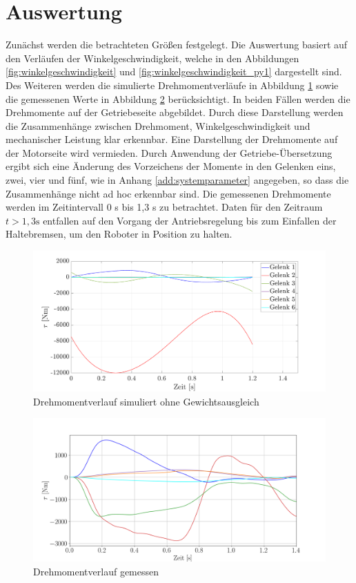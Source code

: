 \section{Auswertung}
Zunächst werden die betrachteten Größen festgelegt. Die Auswertung basiert auf den Verläufen der Winkelgeschwindigkeit, welche in den Abbildungen \ref{fig:winkelgeschwindigkeit} und \ref{fig:winkelgeschwindigkeit_py1} dargestellt sind. Des Weiteren werden die simulierte Drehmomentverläufe in Abbildung \ref{fig:taumat} sowie die gemessenen Werte in Abbildung \ref{fig:tau} berücksichtigt. In beiden Fällen werden die Drehmomente auf der Getriebeseite abgebildet. Durch diese Darstellung werden die Zusammenhänge zwischen Drehmoment, Winkelgeschwindigkeit und mechanischer Leistung klar erkennbar. Eine Darstellung der Drehmomente auf der Motorseite wird vermieden. Durch Anwendung der Getriebe-Übersetzung ergibt sich eine Änderung des Vorzeichens der Momente in den Gelenken eins, zwei, vier und fünf, wie in Anhang \ref{add:systemparameter} angegeben, so dass die Zusammenhänge nicht ad hoc erkennbar sind. Die gemessenen Drehmomente werden im Zeitintervall 0 s bis 1,3 s zu betrachtet. Daten für den Zeitraum $t>1,3\text{s}$ entfallen auf den Vorgang der Antriebsregelung bis zum Einfallen der Haltebremsen, um den Roboter in Position zu halten. 
%
\begin{figure}[tbph]
	\centering
	\includegraphics[width=1\linewidth]{images/taumat}
	\caption{Drehmomentverlauf simuliert ohne Gewichtsausgleich}
	\label{fig:taumat}
\end{figure}
%
\begin{figure}[tbph]
	\centering
	\includegraphics[width=1\linewidth]{images/tau}
	\caption{Drehmomentverlauf gemessen}
	\label{fig:tau}
\end{figure}
%
